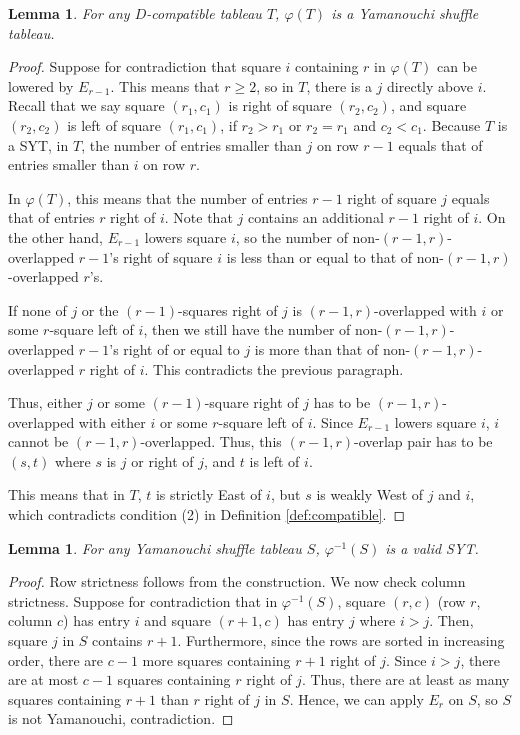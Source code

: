 \documentclass[10pt,a4paper]{article}
\newtheorem{lemma}[theorem]{Lemma}
\theoremstyle{definition}
\numberwithin{equation}{section}
\begin{document}
    \begin{lemma}\label{lem:phiT-yama}
        For any $D$-compatible tableau $T$, $\varphi(T)$ is a Yamanouchi shuffle tableau.
    \end{lemma}

    \begin{proof}
        Suppose for contradiction that square $i$ containing $r$ in $\varphi(T)$ can be lowered by $E_{r-1}$. This means that $r\geq 2$, so in $T$, there is a $j$ directly above $i$. Recall that we say square $(r_1,c_1)$ is right of square $(r_2,c_2)$, and square $(r_2,c_2)$ is left of square $(r_1,c_1)$, if $r_2 > r_1$ or $r_2 = r_1$ and $c_2 < c_1$. Because $T$ is a SYT, in $T$, the number of entries smaller than $j$ on row $r-1$ equals that of entries smaller than $i$ on row $r$.

        In $\varphi(T)$, this means that the number of entries $r-1$ right of square $j$ equals that of entries $r$ right of $i$. Note that $j$ contains an additional $r-1$ right of $i$. On the other hand, $E_{r-1}$ lowers square $i$, so the number of non-$(r-1,r)$-overlapped $r-1$'s right of square $i$ is less than or equal to that of non-$(r-1,r)$-overlapped $r$'s.

        If none of $j$ or the $(r-1)$-squares right of $j$ is $(r-1,r)$-overlapped with $i$ or some $r$-square left of $i$, then we still have the number of non-$(r-1,r)$-overlapped $r-1$'s right of or equal to $j$ is more than that of non-$(r-1,r)$-overlapped $r$ right of $i$. This contradicts the previous paragraph.

        Thus, either $j$ or some $(r-1)$-square right of $j$ has to be $(r-1,r)$-overlapped with either $i$ or some $r$-square left of $i$. Since $E_{r-1}$ lowers square $i$, $i$ cannot be $(r-1,r)$-overlapped. Thus, this $(r-1,r)$-overlap pair has to be $(s,t)$ where $s$ is $j$ or right of $j$, and $t$ is left of $i$.

        This means that in $T$, $t$ is strictly East of $i$, but $s$ is weakly West of $j$ and $i$, which contradicts condition (2) in Definition \ref{def:compatible}.
    \end{proof}

    \begin{lemma}\label{lem:phiS-valid}
        For any Yamanouchi shuffle tableau $S$, $\varphi^{-1}(S)$ is a valid SYT.
    \end{lemma}

    \begin{proof}
        Row strictness follows from the construction. We now check column strictness. Suppose for contradiction that in $\varphi^{-1}(S)$, square $(r,c)$ (row $r$, column $c$) has entry $i$ and square $(r+1,c)$ has entry $j$ where $i > j$. Then, square $j$ in $S$ contains $r+1$. Furthermore, since the rows are sorted in increasing order, there are $c-1$ more squares containing $r+1$ right of $j$. Since $i > j$, there are at most $c-1$ squares containing $r$ right of $j$. Thus, there are at least as many squares containing $r+1$ than $r$ right of $j$ in $S$. Hence, we can apply $E_r$ on $S$, so $S$ is not Yamanouchi, contradiction.
    \end{proof}
\end{document}
